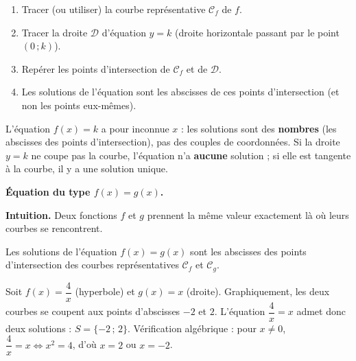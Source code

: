 \documentclass[11pt]{article}
\newcommand{\cle}[1]{{\popxbold\color{popdark}#1}}
\begin{document}
\begin{methode}[Résoudre graphiquement $f(x) = k$]
\begin{enumerate}
\item Tracer (ou utiliser) la courbe représentative $\mathcal{C}_f$ de $f$.
\item Tracer la droite $\mathcal{D}$ d'équation $y = k$ (droite horizontale passant par le point $(0\,;k)$).
\item Repérer les points d'intersection de $\mathcal{C}_f$ et de $\mathcal{D}$.
\item Les solutions de l'équation sont les \cle{abscisses} de ces points d'intersection (et non les points eux-mêmes).
\end{enumerate}
\end{methode}

\begin{attention}
L'équation $f(x) = k$ a pour inconnue $x$ : les solutions sont des \textbf{nombres} (les abscisses des points d'intersection), pas des couples de coordonnées. Si la droite $y = k$ ne coupe pas la courbe, l'équation n'a \textbf{aucune} solution ; si elle est tangente à la courbe, il y a une solution unique.
\end{attention}

\textbf{Équation du type $f(x) = g(x)$.}\par

\textbf{Intuition.} Deux fonctions $f$ et $g$ prennent la même valeur exactement là où leurs courbes se rencontrent.

\begin{definition}[Solution graphique de $f(x) = g(x)$]
Les solutions de l'équation $f(x) = g(x)$ sont les \cle{abscisses} des points d'intersection des courbes représentatives $\mathcal{C}_f$ et $\mathcal{C}_g$.
\end{definition}

\begin{exemplebox}
Soit $f(x) = \dfrac{4}{x}$ (hyperbole) et $g(x) = x$ (droite). Graphiquement, les deux courbes se coupent aux points d'abscisses $-2$ et $2$. L'équation $\dfrac{4}{x} = x$ admet donc deux solutions : $S = \{-2\,;\,2\}$. Vérification algébrique : pour $x \neq 0$, $\dfrac{4}{x} = x \iff x^2 = 4$, d'où $x = 2$ ou $x = -2$.
\end{exemplebox}
\end{document}
